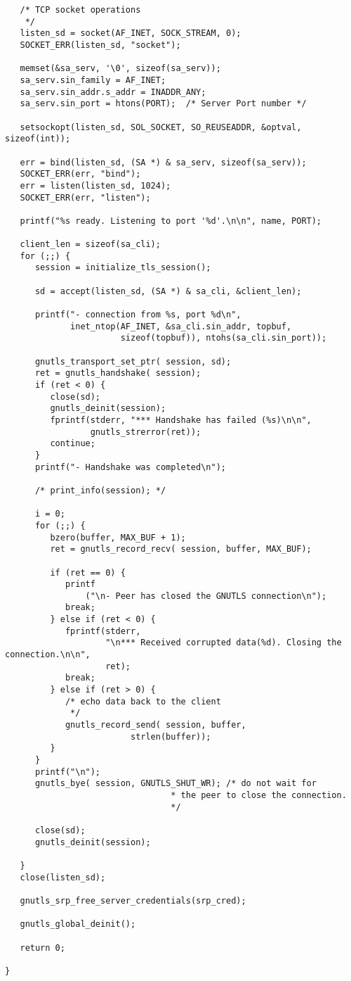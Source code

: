 \begin{verbatim}
   /* TCP socket operations
    */
   listen_sd = socket(AF_INET, SOCK_STREAM, 0);
   SOCKET_ERR(listen_sd, "socket");

   memset(&sa_serv, '\0', sizeof(sa_serv));
   sa_serv.sin_family = AF_INET;
   sa_serv.sin_addr.s_addr = INADDR_ANY;
   sa_serv.sin_port = htons(PORT);  /* Server Port number */

   setsockopt(listen_sd, SOL_SOCKET, SO_REUSEADDR, &optval, sizeof(int));

   err = bind(listen_sd, (SA *) & sa_serv, sizeof(sa_serv));
   SOCKET_ERR(err, "bind");
   err = listen(listen_sd, 1024);
   SOCKET_ERR(err, "listen");

   printf("%s ready. Listening to port '%d'.\n\n", name, PORT);

   client_len = sizeof(sa_cli);
   for (;;) {
      session = initialize_tls_session();

      sd = accept(listen_sd, (SA *) & sa_cli, &client_len);

      printf("- connection from %s, port %d\n",
             inet_ntop(AF_INET, &sa_cli.sin_addr, topbuf,
                       sizeof(topbuf)), ntohs(sa_cli.sin_port));

      gnutls_transport_set_ptr( session, sd);
      ret = gnutls_handshake( session);
      if (ret < 0) {
         close(sd);
         gnutls_deinit(session);
         fprintf(stderr, "*** Handshake has failed (%s)\n\n",
                 gnutls_strerror(ret));
         continue;
      }
      printf("- Handshake was completed\n");

      /* print_info(session); */

      i = 0;
      for (;;) {
         bzero(buffer, MAX_BUF + 1);
         ret = gnutls_record_recv( session, buffer, MAX_BUF);

         if (ret == 0) {
            printf
                ("\n- Peer has closed the GNUTLS connection\n");
            break;
         } else if (ret < 0) {
            fprintf(stderr,
                    "\n*** Received corrupted data(%d). Closing the connection.\n\n",
                    ret);
            break;
         } else if (ret > 0) {
            /* echo data back to the client
             */
            gnutls_record_send( session, buffer,
                         strlen(buffer));
         }
      }
      printf("\n");
      gnutls_bye( session, GNUTLS_SHUT_WR); /* do not wait for
                                 * the peer to close the connection.
                                 */

      close(sd);
      gnutls_deinit(session);

   }
   close(listen_sd);

   gnutls_srp_free_server_credentials(srp_cred);

   gnutls_global_deinit();

   return 0;

}

\end{verbatim}
